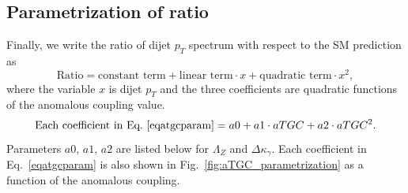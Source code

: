 \subsection{Parametrization of ratio}
Finally, we write the ratio of dijet $p_T$ spectrum 
with respect to the SM prediction as 
\begin{equation}
\text{Ratio} = \text{constant term} + 
\text{linear term} \cdot x + \text{quadratic term} \cdot x^2,
\label{eqatgcparam}
\end{equation}
where the variable $x$ is dijet $p_T$ and 
the three coefficients are quadratic functions of 
the anomalous coupling value.
\begin{equation}
\text{Each coefficient in Eq.~\ref{eqatgcparam}} = a0 + a1 \cdot aTGC + a2 \cdot aTGC^2.
\end{equation}
Parameters $a0$, $a1$, $a2$ are listed 
below for $\Lambda_Z$ and $\Delta{\kappa_\gamma}$.
Each coefficient in Eq.~\ref{eqatgcparam} 
is also  shown in Fig.~\ref{fig:aTGC_parametrization} 
as a function of the anomalous coupling.
